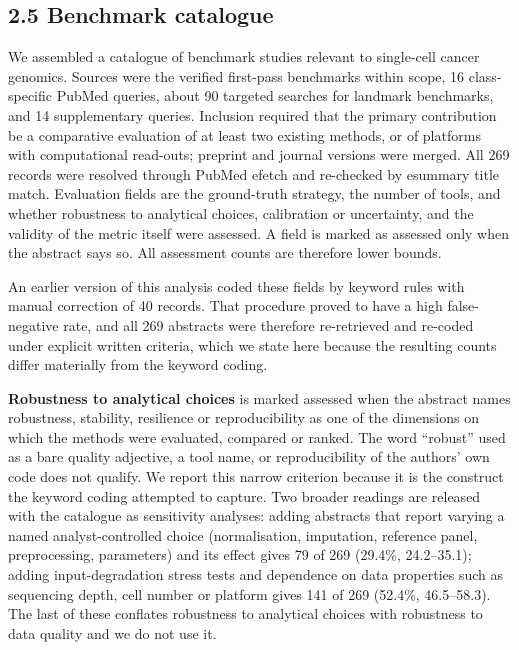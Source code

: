 \documentclass{article}
\begin{document}
\subsection{2.5 Benchmark catalogue}\label{benchmark-catalogue}

We assembled a catalogue of benchmark studies relevant to single-cell
cancer genomics. Sources were the verified first-pass benchmarks within
scope, 16 class-specific PubMed queries, about 90 targeted searches for
landmark benchmarks, and 14 supplementary queries. Inclusion required
that the primary contribution be a comparative evaluation of at least
two existing methods, or of platforms with computational read-outs;
preprint and journal versions were merged. All 269 records were resolved
through PubMed efetch and re-checked by esummary title match. Evaluation
fields are the ground-truth strategy, the number of tools, and whether
robustness to analytical choices, calibration or uncertainty, and the
validity of the metric itself were assessed. A field is marked as
assessed only when the abstract says so. All assessment counts are
therefore lower bounds.

An earlier version of this analysis coded these fields by keyword rules
with manual correction of 40 records. That procedure proved to have a
high false-negative rate, and all 269 abstracts were therefore
re-retrieved and re-coded under explicit written criteria, which we
state here because the resulting counts differ materially from the
keyword coding.

\textbf{Robustness to analytical choices} is marked assessed when the
abstract names robustness, stability, resilience or reproducibility as
one of the dimensions on which the methods were evaluated, compared or
ranked. The word ``robust'' used as a bare quality adjective, a tool
name, or reproducibility of the authors' own code does not qualify. We
report this narrow criterion because it is the construct the keyword
coding attempted to capture. Two broader readings are released with the
catalogue as sensitivity analyses: adding abstracts that report varying
a named analyst-controlled choice (normalisation, imputation, reference
panel, preprocessing, parameters) and its effect gives 79 of 269
(29.4\%, 24.2--35.1); adding input-degradation stress tests and
dependence on data properties such as sequencing depth, cell number or
platform gives 141 of 269 (52.4\%, 46.5--58.3). The last of these
conflates robustness to analytical choices with robustness to data
quality and we do not use it.
\end{document}

